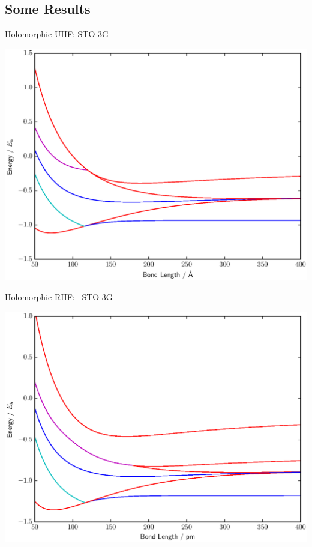 \documentclass{beamer}
\begin{document}
\subsection{Some Results}
\begin{frame}{Holomorphic UHF:  STO-3G}
\vspace{-0.9em}
  \begin{center}
    \includegraphics[scale=0.45]{20161219_ThomGroup_Update/BFGS_UHF_HH_sto-3g}
  \end{center}
\end{frame}

\begin{frame}{Holomorphic RHF: \ STO-3G}
\vspace{-0.9em}
  \begin{center}
    \includegraphics[scale=0.45]{20161219_ThomGroup_Update/BFGS_UHF_HZ_0-20_sto-3g}
  \end{center}
\end{frame}
\end{document}
